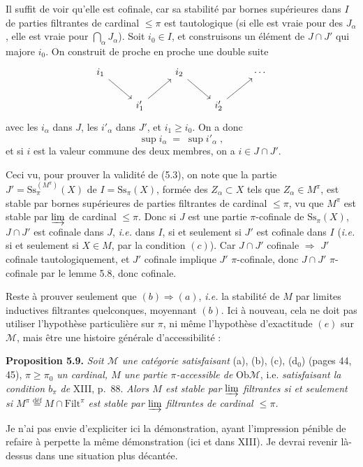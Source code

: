 \documentclass[11pt]{article}
\newcommand{\msp}[1]{\marginpar{\raggedright\footnotesize [#1]}}
\newcommand{\Filt}{\mathrm{Filt}}
\newcommand{\Ob}{\mathrm{Ob}}
\newcommand{\Ss}{\mathrm{Ss}}
\newcommand{\M}{\mathcal{M}}
\begin{document}
Il suffit de voir qu'elle est cofinale, car sa stabilité par bornes supérieures dans $I$ de parties filtrantes de cardinal $\leq \pi$ est tautologique (si elle est vraie pour des $J_\alpha$, elle est vraie pour $\bigcap_\alpha J_\alpha$). Soit $i_0 \in I$, et construisons un élément de $J \cap J'$ qui majore $i_0$. On construit de proche en proche une double suite
\[
\begin{tikzcd}
i_1 \arrow[dr] & & i_2 \arrow[dr] & & \cdots \\
& i'_1 \arrow[ur] & & i'_2 \arrow[ur] &
\end{tikzcd}
\]
avec les $i_\alpha$ dans $J$, les $i'_\alpha$ dans $J'$, et $i_1 \geq i_0$. On a donc
\[
\sup i_\alpha \;=\; \sup i'_\alpha \;,
\]
et si $i$ est la valeur commune des deux membres, on a $i \in J \cap J'$.

Ceci vu, pour prouver la validité de (5.3), on note que la partie $J' = \Ss_\pi^{(M^\pi)}(X)$ de $I = \Ss_\pi(X)$, formée des $Z_\alpha \subset X$ tels que $Z_\alpha \in M^\pi$, est stable par bornes supérieures de parties filtrantes de cardinal $\leq \pi$, vu que $M^\pi$ est stable
\msp{page 61}
par $\varinjlim$ de cardinal $\leq \pi$. Donc si $J$ est une partie $\pi$-cofinale de $\Ss_\pi(X)$, $J \cap J'$ est cofinale dans $J$, \textit{i.e.} dans $I$, si et seulement si $J'$ est cofinale dans $I$ (\textit{i.e.} si et seulement si $X \in M$, par la condition $(c)$). Car $J \cap J'$ cofinale $\Longrightarrow$ $J'$ cofinale tautologiquement, et $J'$ cofinale implique $J'$ $\pi$-cofinale, donc $J \cap J'$ $\pi$-cofinale par le lemme 5.8, donc cofinale.

Reste à prouver seulement que $(b) \Longrightarrow (a)$, \textit{i.e.} la stabilité de $M$ par limites inductives filtrantes quelconques, moyennant $(b)$. Ici à nouveau, cela ne doit pas utiliser l'hypothèse particulière sur $\pi$, ni même l'hypothèse d'exactitude $(e)$ sur $\M$, mais être une histoire générale d'accessibilité :

\textbf{Proposition 5.9.} \textit{Soit $\M$ une catégorie satisfaisant} (a), (b), (c), (d$_0$) (pages 44, 45), \textit{$\pi \geq \pi_0$ un cardinal, $M$ une partie $\pi$-accessible de} $\Ob\M$, i.e. \textit{satisfaisant la condition $b_\pi$ de} XIII, p.~88. \textit{Alors $M$ est stable par $\varinjlim$ filtrantes si et seulement si $M^\pi \overset{\text{déf}}{=} M \cap \Filt^\pi$ est stable par $\varinjlim$ filtrantes de cardinal $\leq \pi$.}

Je n'ai pas envie d'expliciter ici la démonstration, ayant l'impression pénible de refaire à perpette la même démonstration (ici et dans XIII). Je devrai revenir là-dessus dans une situation plus décantée.
\end{document}
